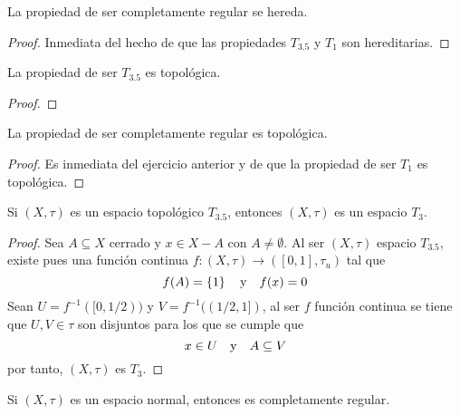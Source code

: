 \documentclass[12pt]{report}
\newcounter{it}
\theoremstyle{largebreak}
\newcommand\cf[3]{\ensuremath{#1:#2\rightarrow#3}}
\begin{document}
    \begin{cor}
        La propiedad de ser completamente regular se hereda.
    \end{cor}

    \begin{proof}
        Inmediata del hecho de que las propiedades $T_{3.5}$ y $T_1$ son hereditarias.
    \end{proof}

    \begin{excer}
        La propiedad de ser $T_{3.5}$ es topológica.
    \end{excer}

    \begin{proof}
        
    \end{proof}

    \begin{cor}
        La propiedad de ser completamente regular es topológica.
    \end{cor}

    \begin{proof}
        Es inmediata del ejercicio anterior y de que la propiedad de ser $T_1$ es topológica.
    \end{proof}

    \begin{propo}
        Si $(X,\tau)$ es un espacio topológico $T_{3.5}$, entonces $(X,\tau)$ es un espacio $T_3$.
    \end{propo}

    \begin{proof}
        Sea $A\subseteq X$ cerrado y $x\in X-A$ con $A\neq\emptyset$. Al ser $(X,\tau)$ espacio $T_{3.5}$, existe pues una función continua $\cf{f}{(X,\tau)}{([0,1],\tau_u)}$ tal que
        \begin{equation*}
            f(A)=\left\{1 \right\}\quad\textup{y}\quad f(x)=0
        \end{equation*}
        Sean $U=f^{-1}([0,1/2))$ y $V=f^{-1}((1/2,1])$, al ser $f$ función continua se tiene que $U,V\in\tau$ son disjuntos para los que se cumple que
        \begin{equation*}
            x\in U\quad\textup{y}\quad A\subseteq V
        \end{equation*}
        por tanto, $(X,\tau)$ es $T_3$.
    \end{proof}

    \begin{propo}
        Si $(X,\tau)$ es un espacio normal, entonces es completamente regular.
    \end{propo}
\end{document}
